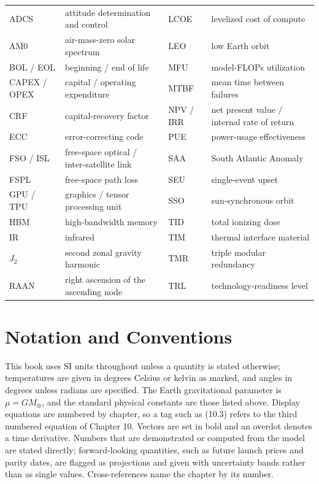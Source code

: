 \documentclass[
  11pt,
  openany,
  oneside]{book}
\newcounter{none} %
\begin{document}
{\def\LTcaptype{none} %
\begin{longtable}[]{@{}
  >{\raggedright\arraybackslash}p{}
  >{\raggedright\arraybackslash}p{}
  >{\raggedright\arraybackslash}p{}
  >{\raggedright\arraybackslash}p{}@{}}
\toprule\noalign{}
\endhead
\bottomrule\noalign{}
\endlastfoot
ADCS & attitude determination and control & LCOE & levelized cost of
compute \\
AM0 & air-mass-zero solar spectrum & LEO & low Earth orbit \\
BOL / EOL & beginning / end of life & MFU & model-FLOPs utilization \\
CAPEX / OPEX & capital / operating expenditure & MTBF & mean time
between failures \\
CRF & capital-recovery factor & NPV / IRR & net present value / internal
rate of return \\
ECC & error-correcting code & PUE & power-usage effectiveness \\
FSO / ISL & free-space optical / inter-satellite link & SAA & South
Atlantic Anomaly \\
FSPL & free-space path loss & SEU & single-event upset \\
GPU / TPU & graphics / tensor processing unit & SSO & sun-synchronous
orbit \\
HBM & high-bandwidth memory & TID & total ionizing dose \\
IR & infrared & TIM & thermal interface material \\
\(J_2\) & second zonal gravity harmonic & TMR & triple modular
redundancy \\
RAAN & right ascension of the ascending node & TRL &
technology-readiness level \\
\end{longtable}
}

\chapter{Notation and Conventions}\label{notation-and-conventions}

This book uses SI units throughout unless a quantity is stated
otherwise; temperatures are given in degrees Celsius or kelvin as
marked, and angles in degrees unless radians are specified. The Earth
gravitational parameter is \(\mu = G M_\oplus\), and the standard
physical constants are those listed above. Display equations are
numbered by chapter, so a tag such as (10.3) refers to the third
numbered equation of Chapter 10. Vectors are set in bold and an overdot
denotes a time derivative. Numbers that are demonstrated or computed
from the model are stated directly; forward-looking quantities, such as
future launch prices and parity dates, are flagged as projections and
given with uncertainty bands rather than as single values.
Cross-references name the chapter by its number.
\end{document}
